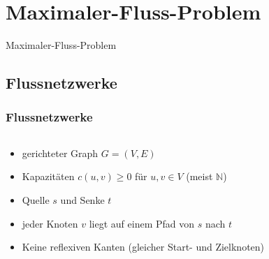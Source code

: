 \documentclass{beamer}
\begin{document}
\section{Maximaler-Fluss-Problem}
\begin{frame}[plain]
\begin{center}
\begin{LARGE}
Maximaler-Fluss-Problem
\end{LARGE}
\end{center}
\end{frame}

\subsection{Flussnetzwerke}
\begin{frame}
\frametitle{Flussnetzwerke}
\begin{columns}
\begin{column}{.45\textwidth}
\begin{itemize}
\item<1-> gerichteter Graph $G=(V,E)$
\item<2-> Kapazitäten $c(u,v) \geq 0$ für $u,v \in V$ (meist $\mathbb{N}$)
\item<3-> Quelle $s$ und Senke $t$
\item<4-> jeder Knoten $v$ liegt auf einem Pfad von $s$ nach $t$
\item<5-> Keine reflexiven Kanten (gleicher Start- und Zielknoten)
\end{itemize}
\end{column}
\begin{column}{.6\textwidth}
\begin{adjustbox}{width=\textwidth}
\end{adjustbox}
\end{column}
\end{columns}
\end{frame}
\end{document}
